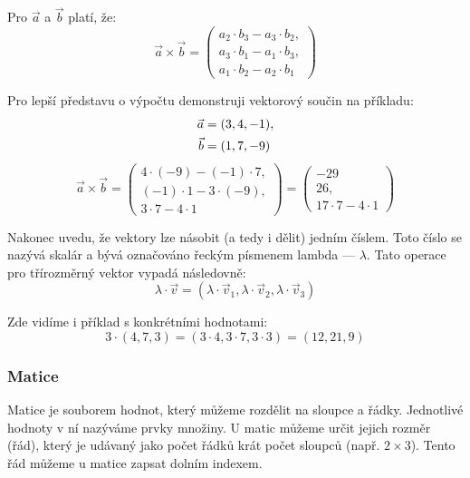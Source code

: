 \documentclass[12pt]{article}
\begin{document}
Pro $\vec{a}$ a $\vec{b}$ platí, že:
\begin{equation}
    \vec{a} \times \vec{b} = \begin{pmatrix}
        a_2 \cdot b_3 - a_3 \cdot b_2, \\
        a_3 \cdot b_1 - a_1 \cdot b_3, \\
        a_1 \cdot b_2 - a_2 \cdot b_1
    \end{pmatrix}
\end{equation}

Pro lepší představu o výpočtu demonstruji vektorový součin na příkladu:
\begin{align}
    \vec{a} &= (3, 4, -1), \notag \\
    \vec{b} &= (1, 7, -9)
\end{align}
\begin{equation}
    \vec{a} \times \vec{b} = \begin{pmatrix}
        4 \cdot (-9) - (-1) \cdot 7, \\
        (-1) \cdot 1 - 3 \cdot (-9), \\
        3 \cdot 7 - 4 \cdot 1
    \end{pmatrix} = \begin{pmatrix}
        -29 \\
        26, \\
        17 \cdot 7 - 4 \cdot 1
    \end{pmatrix}
\end{equation}

Nakonec uvedu, že vektory lze násobit (a tedy i dělit) jedním číslem. Toto číslo se nazývá skalár a bývá označováno řeckým písmenem lambda — $\lambda$. Tato operace pro třírozměrný vektor vypadá následovně:
\begin{equation}
    \lambda \cdot \vec{v} = (\lambda \cdot \vec{v}_1, \lambda \cdot \vec{v}_2, \lambda \cdot \vec{v}_3)
\end{equation}

Zde vidíme i příklad s konkrétními hodnotami:
\begin{equation}
    3 \cdot (4, 7, 3) = (3 \cdot 4, 3 \cdot 7, 3 \cdot 3) = (12, 21, 9)
\end{equation}

\subsubsection{Matice}

Matice je souborem hodnot, který můžeme rozdělit na sloupce a řádky. Jednotlivé hodnoty v ní nazýváme prvky množiny. U matic můžeme určit jejich rozměr (řád), který je udávaný jako počet řádků krát počet sloupců (např. $2 \times 3$). Tento řád můžeme u matice zapsat dolním indexem. \cite{matrix}
\end{document}
